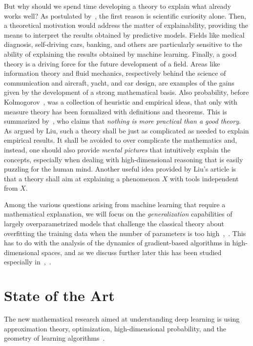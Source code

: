 \documentclass[reqno]{amsart}
\begin{document}
But why should we spend time developing a theory to explain what already works well? As postulated by~\cite{berner}, the first reason is scientific curiosity alone. Then, a theoretical motivation would address the matter of explainability, providing the means to interpret the results obtained by predictive models. Fields like medical diagnosis, self-driving cars, banking, and others are particularly sensitive to the ability of explaining the results obtained by machine learning. Finally, a good theory is a driving force for the future development of a field. Areas like information theory and fluid mechanics, respectively behind the science of communication and aircraft, yacht, and car design, are examples of the gains given by the development of a strong mathematical basis. Also probability, before Kolmogorov~\cite{kolmogorov}, was a collection of heuristic and empirical ideas, that only with measure theory has been formalized with definitions and theorems. This is summarized by~\cite{vapkin}, who claims that {\it\/nothing is more practical than a good theory}. 
As argued by Liu, such a theory shall be just as complicated as needed to explain empirical results. It shall be avoided to over complicate the mathematics and, instead, one should also provide {\it\/mental pictures} that intuitively explain the concepts, especially when dealing with high-dimensional reasoning that is easily puzzling for the human mind. Another useful idea provided by Liu's article is that a theory shall aim at explaining a phenomenon $X$ with tools independent from $X$.  

Among the various questions arising from machine learning that require a mathematical explanation, we will focus on the {\it\/generalization} capabilities of largely overparametrized models that challenge the classical theory about overfitting the training data when the number of parameters is too high~\cite{zhang},~\cite{berner}. This has to do with the analysis of the dynamics of gradient-based algorithms in high-dimensional spaces, and as we discuss further later this has been studied especially in~\cite{belkindescent},~\cite{volhejn}. 

\section{State of the Art}

The new mathematical research aimed at understanding deep learning is using approximation theory, optimization, high-dimensional probability, and the geometry of learning algorithms~\cite{berner,poggio}.
\end{document}
